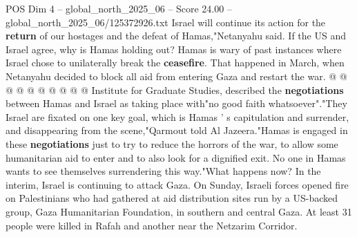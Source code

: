 \begin{textsample}{POS Dim 4 – global\_north\_2025\_06 – Score 24.00 – global\_north\_2025\_06/125372926.txt}
Israel will continue its action for the \textbf{return} of our hostages and the defeat of Hamas,"Netanyahu said.
If the US and Israel agree, why is Hamas holding out?
Hamas is wary of past instances where Israel chose to unilaterally break the \textbf{ceasefire}.
That happened in March, when Netanyahu decided to block all aid from entering Gaza and restart the war. @ @ @ @ @ @ @ @ @ @ Institute for Graduate Studies, described the \textbf{negotiations} between Hamas and Israel as taking place with"no good faith whatsoever"."They Israel are fixated on one key goal, which is Hamas ' s capitulation and surrender, and disappearing from the scene,"Qarmout told Al Jazeera."Hamas is engaged in these \textbf{negotiations} just to try to reduce the horrors of the war, to allow some humanitarian aid to enter and to also look for a dignified exit.
No one in Hamas wants to see themselves surrendering this way."What happens now?
In the interim, Israel is continuing to attack Gaza.
On Sunday, Israeli forces opened fire on Palestinians who had gathered at aid distribution sites run by a US-backed group, Gaza Humanitarian Foundation, in southern and central Gaza.
At least 31 people were killed in Rafah and another near the Netzarim Corridor.

\end{textsample}
